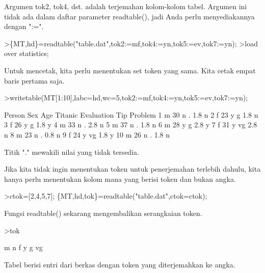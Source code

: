 \documentclass[a4paper,10pt]{article}
\begin{document}
\begin{eulernotebook}
\begin{eulercomment}
Argumen tok2, tok4, dst. adalah terjemahan kolom-kolom tabel. Argumen
ini tidak ada dalam daftar parameter readtable(), jadi Anda perlu
menyediakannya dengan ":=".
\end{eulercomment}
\begin{eulerprompt}
>\{MT,hd\}=readtable("table.dat",tok2:=mf,tok4:=yn,tok5:=ev,tok7:=yn);
>load over statistics;
\end{eulerprompt}
\begin{eulercomment}
Untuk mencetak, kita perlu menentukan set token yang sama. Kita cetak
empat baris pertama saja.
\end{eulercomment}
\begin{eulerprompt}
>writetable(MT[1:10],labc=hd,wc=5,tok2:=mf,tok4:=yn,tok5:=ev,tok7:=yn);
\end{eulerprompt}
\begin{euleroutput}
   Person  Sex  Age Titanic Evaluation  Tip Problem
        1    m   30       n          .  1.8       n
        2    f   23       y          g  1.8       n
        3    f   26       y          g  1.8       y
        4    m   33       n          .  2.8       n
        5    m   37       n          .  1.8       n
        6    m   28       y          g  2.8       y
        7    f   31       y         vg  2.8       n
        8    m   23       n          .  0.8       n
        9    f   24       y         vg  1.8       y
       10    m   26       n          .  1.8       n
\end{euleroutput}
\begin{eulercomment}
Titik "." mewakili nilai yang tidak tersedia.

Jika kita tidak ingin menentukan token untuk penerjemahan terlebih
dahulu, kita hanya perlu menentukan kolom mana yang berisi token dan
bukan angka.
\end{eulercomment}
\begin{eulerprompt}
>ctok=[2,4,5,7]; \{MT,hd,tok\}=readtable("table.dat",ctok=ctok);
\end{eulerprompt}
\begin{eulercomment}
Fungsi readtable() sekarang mengembalikan serangkaian token.
\end{eulercomment}
\begin{eulerprompt}
>tok
\end{eulerprompt}
\begin{euleroutput}
  m
  n
  f
  y
  g
  vg
\end{euleroutput}
\begin{eulercomment}
Tabel berisi entri dari berkas dengan token yang diterjemahkan ke
angka.


\end{eulercomment}
\end{eulernotebook}
\end{document}
